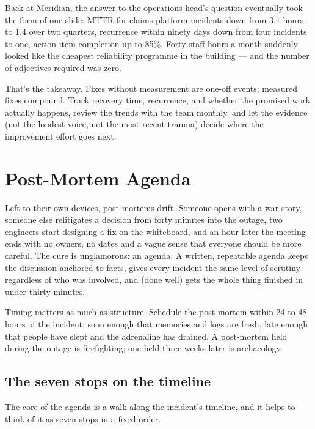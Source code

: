 Back at Meridian, the answer to the operations head's question eventually took the form of one slide: MTTR for claims-platform incidents down from 3.1 hours to 1.4 over two quarters, recurrence within ninety days down from four incidents to one, action-item completion up to 85\%. Forty staff-hours a month suddenly looked like the cheapest reliability programme in the building — and the number of adjectives required was zero.


That's the takeaway. Fixes without measurement are one-off events; measured fixes compound. Track recovery time, recurrence, and whether the promised work actually happens, review the trends with the team monthly, and let the evidence (not the loudest voice, not the most recent trauma) decide where the improvement effort goes next.

\section{Post-Mortem Agenda}
Left to their own devices, post-mortems drift. Someone opens with a war story, someone else relitigates a decision from forty minutes into the outage, two engineers start designing a fix on the whiteboard, and an hour later the meeting ends with no owners, no dates and a vague sense that everyone should be more careful. The cure is unglamorous: an agenda. A written, repeatable agenda keeps the discussion anchored to facts, gives every incident the same level of scrutiny regardless of who was involved, and (done well) gets the whole thing finished in under thirty minutes.


Timing matters as much as structure. Schedule the post-mortem within 24 to 48 hours of the incident: soon enough that memories and logs are fresh, late enough that people have slept and the adrenaline has drained. A post-mortem held during the outage is firefighting; one held three weeks later is archaeology.



\subsection{The seven stops on the timeline}


The core of the agenda is a walk along the incident's timeline, and it helps to think of it as seven stops in a fixed order.


